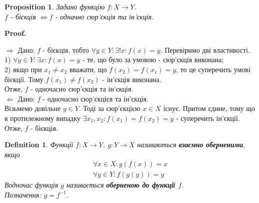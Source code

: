 \documentclass[a4paper, 14pt]{article}
\makeatletter
\def\qed{$\blacksquare$}
\def\rightproof{$\boxed{\Rightarrow}$ }
\def\leftproof{$\boxed{\Leftarrow}$ }
\theoremstyle{theoremdd}
\theoremstyle{theoremdd}
\newtheorem{definition}[theorem]{Definition}
\theoremstyle{theoremdd}
\theoremstyle{theoremdd}
\theoremstyle{theoremdd}
\newtheorem{proposition}[theorem]{Proposition}
\theoremstyle{theoremdd}
\theoremstyle{theoremdd}
\theoremstyle{theoremdd}
\renewenvironment{proof}[1][Proof.\\]{\par
\pushQED{\hfill \qed}%
\normalfont \topsep6\p@\@plus6\p@\relax
\trivlist
\item\relax
{\bfseries
#1\@addpunct{.}}\hspace\labelsep\ignorespaces
}{%
\popQED\endtrivlist\@endpefalse
}
\makeatother
\begin{document}
	\begin{proposition}
	Задано функцію $f \colon X \to Y$. \\
	$f$ - бієкція $\iff f$ - одначно сюр'єкція та ін'єкція.
	\end{proposition}
	
	\begin{proof}
	\rightproof Дано: $f$ - бієкція, тобто $\forall y \in Y: \exists! x: f(x) = y$. Перевіримо дві властивості.\\
	1) $\forall y \in Y: \exists x: f(x) = y$ - те, що було за умовою - сюр'єкція виконана;\\
	2) якщо при $x_1 \neq x_2$ вважати, що $f(x_2) = f(x_1) = y$, то це суперечить умові бієкції. Тому $f(x_1) \neq f(x_2)$ - ін'єкція виконана.\\
	Отже, $f$ - одночасно сюр'єкція та ін'єкція.
	\bigskip \\
	\leftproof Дано: $f$ - одночасно сюр'єкцієя та ін'єкція.\\
	Візьмемо довільне $y \in Y$. Тоді за сюр'єкцією $x \in X$ існує. Притом єдине, тому що в протилежному випадку $\exists x_1, x_2: f(x_1) = f(x_2) = y$ - суперечить ін'єкції.\\ 
	Отже, $f$ - бієкція.
	\end{proof}
	
	\begin{definition}
	Функції $f \colon X \to Y,\ g \colon Y \to X$ називаються \textbf{взаємно оберненими}, якщо
	\begin{align*}
	\forall x \in X: g(f(x)) = x \\
	\forall y \in Y: f(g(y)) = y
	\end{align*}
	Водночас функція $g$ називається \textbf{оберненою до функції $f$}.\\
	Позначення: $g = f^{-1}$.
\begin{figure}[H]
\end{figure}
	\end{definition}
	
\end{document}

